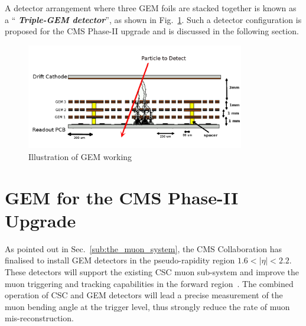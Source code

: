 A detector arrangement where three GEM foils are stacked together is known as a ``\textit{ \textbf{Triple-GEM detector}}'', as shown in Fig.~\ref{fig:gemgaps}. Such a detector configuration is proposed for the CMS Phase-II upgrade and is discussed in the following section.
\begin{figure}[!htbp]
    \begin{center}
        \includegraphics[width=0.85\textwidth]{figures/GEM/triple_gem.png}
        \caption{Illustration of GEM working}
        \label{fig:gemgaps}
    \end{center}
\end{figure} 


\section{GEM for the CMS Phase-II Upgrade} %
\label{sec:gem_for_cms}
As pointed out in Sec.~\ref{sub:the_muon_system},  the CMS Collaboration has finalised to install GEM detectors in the pseudo-rapidity region $1.6 < |\eta| < 2.2$.
These detectors will support the existing CSC muon sub-system and improve the muon triggering and tracking capabilities in the forward region~\cite{Colaleo:2021453}.
The combined operation of CSC and GEM detectors will lead a precise measurement of the muon bending angle at the trigger level, thus strongly reduce the rate of muon mis-reconstruction.

